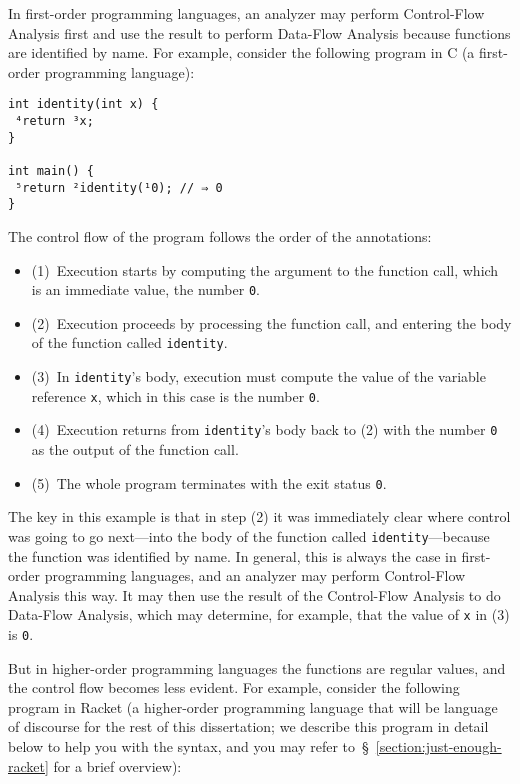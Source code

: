 \documentclass[12pt, oneside]{book}
\begin{document}
In first-order programming languages, an analyzer may perform Control-Flow Analysis first and use the result to perform Data-Flow Analysis because functions are identified by name. For example, consider the following program in C (a first-order programming language):

\begin{Verbatim}
int identity(int x) {
 ⁴return ³x;
}

int main() {
 ⁵return ²identity(¹0); // ⇒ 0
}
\end{Verbatim}

The control flow of the program follows the order of the annotations:

\begin{itemize}
  \item (1)~Execution starts by computing the argument to the function call, which is an immediate value, the number \texttt{0}.
  \item (2)~Execution proceeds by processing the function call, and entering the body of the function called \texttt{identity}.
  \item (3)~In \texttt{identity}’s body, execution must compute the value of the variable reference \texttt{x}, which in this case is the number \texttt{0}.
  \item (4)~Execution returns from \texttt{identity}’s body back to (2) with the number \texttt{0} as the output of the function call.
  \item (5)~The whole program terminates with the exit status \texttt{0}.
\end{itemize}

The key in this example is that in step (2) it was immediately clear where control was going to go next—into the body of the function called \texttt{identity}—because the function was identified by name. In general, this is always the case in first-order programming languages, and an analyzer may perform Control-Flow Analysis this way. It may then use the result of the Control-Flow Analysis to do Data-Flow Analysis, which may determine, for example, that the value of \texttt{x} in (3) is \texttt{0}.

But in higher-order programming languages the functions are regular values, and the control flow becomes less evident. For example, consider the following program in Racket (a higher-order programming language that will be language of discourse for the rest of this dissertation; we describe this program in detail below to help you with the syntax, and you may refer to~§~\ref{section:just-enough-racket} for a brief overview):
\end{document}
